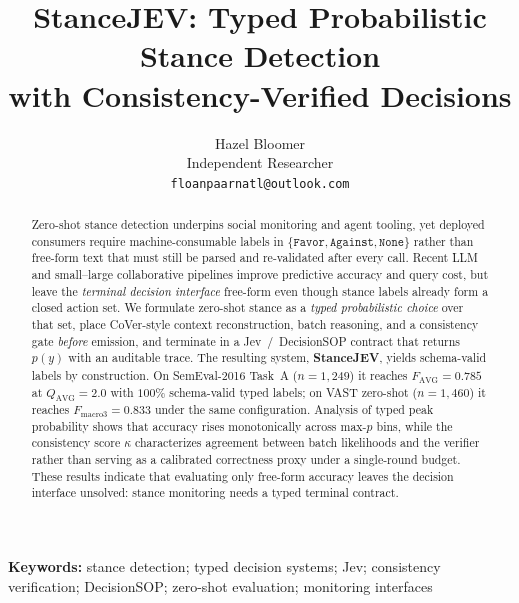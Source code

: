 \documentclass[10pt]{article}
\theoremstyle{definition}
\begin{document}
\title{\vspace{-2.2em}\bfseries\Large StanceJEV: Typed Probabilistic Stance Detection\\[2pt]
with Consistency-Verified Decisions}
\author{\normalsize Hazel Bloomer\\[2pt]
{\small Independent Researcher}\\[1pt]
{\small\texttt{floanpaarnatl@outlook.com}}}
\date{}
\maketitle
\vspace{-1.1em}

\begin{abstract}
\noindent Zero-shot stance detection underpins social monitoring and agent tooling, yet deployed consumers
require machine-consumable labels in $\{\texttt{Favor},\texttt{Against},\texttt{None}\}$ rather than
free-form text that must still be parsed and re-validated after every call.
Recent LLM and small--large collaborative pipelines improve predictive accuracy and query cost, but leave the
\emph{terminal decision interface} free-form even though stance labels already form a closed action set.
We formulate zero-shot stance as a \emph{typed probabilistic choice} over that set, place CoVer-style
context reconstruction, batch reasoning, and a consistency gate \emph{before} emission, and terminate in a
Jev~/~DecisionSOP contract that returns $p(y)$ with an auditable trace.
The resulting system, \textbf{StanceJEV}, yields schema-valid labels by construction.
On SemEval-2016 Task~A ($n{=}1{,}249$) it reaches $F_{\mathrm{AVG}}{=}0.785$ at $Q_{\mathrm{AVG}}{=}2.0$
with $100\%$ schema-valid typed labels; on VAST zero-shot ($n{=}1{,}460$) it reaches
$F_{\mathrm{macro3}}{=}0.833$ under the same configuration.
Analysis of typed peak probability shows that accuracy rises monotonically across max-$p$ bins, while the
consistency score $\kappa$ characterizes agreement between batch likelihoods and the verifier rather than
serving as a calibrated correctness proxy under a single-round budget.
These results indicate that evaluating only free-form accuracy leaves the decision interface unsolved:
stance monitoring needs a typed terminal contract.
\end{abstract}

\vspace{0.35em}
\noindent\textbf{Keywords:} stance detection; typed decision systems; Jev; consistency verification;
DecisionSOP; zero-shot evaluation; monitoring interfaces
\end{document}
